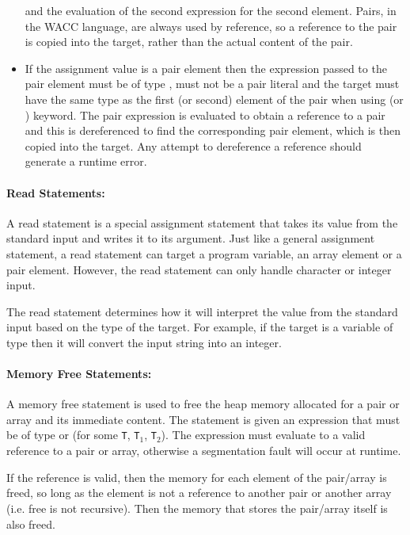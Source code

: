 \documentclass[a4paper]{article}
\theoremstyle{definition}
\begin{document}
\begin{itemize}
       and the evaluation of the second expression for the second element.
       Pairs, in the WACC language, are always used by reference, so a reference to the pair is copied into the target, rather than the actual content of the pair.
 \item If the assignment value is a pair element  then the expression passed to the pair element 
       must be of type , must not be a  pair literal and the target must have the same type as the first (or second) element of the pair when using  (or ) keyword.
       The pair expression is evaluated to obtain a reference to a pair and this is dereferenced to find the corresponding pair element, which is then copied into the target.
       Any attempt to dereference a  reference should generate a runtime error. 
 \end{itemize}

\paragraph{Read Statements:}
A read statement  is a special assignment statement that takes its value from the standard input and writes it to its argument.
Just like a general assignment statement, a read statement can target a program variable, an array element or a pair element. 
However, the read statement can only handle character or integer input.

The read statement determines how it will interpret the value from the standard input based on the type of the target.
For example, if the target is a variable of type  then it will convert the input string into an integer.

\paragraph{Memory Free Statements:}
A memory free statement  is used to free the heap memory allocated for a pair or array and its immediate content. 
The statement is given an expression that must be of type  or  (for some {\tt T}, {\tt T}$_1$, {\tt T}$_2$). 
The expression must evaluate to a valid reference to a pair or array, otherwise a segmentation fault will occur at runtime.

If the reference is valid, then the memory for each element of the pair/array is freed, so long as the element is not a reference to another pair or another array
(i.e. free is not recursive). 
Then the memory that stores the pair/array itself is also freed.
\end{document}
